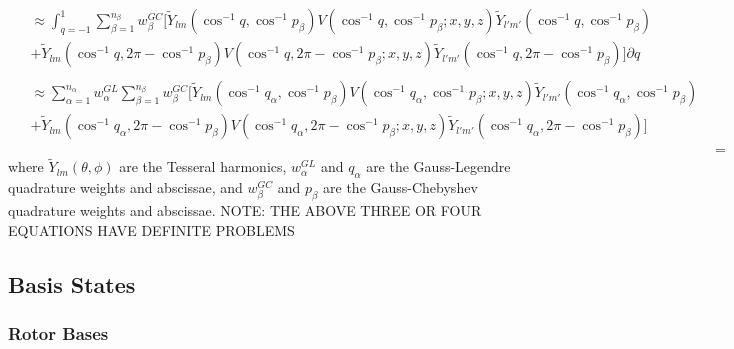 \documentclass{revtex4-1}
\begin{document}
\begin{align}
											 \begin{split} &\approx\int_{q=-1}^{1}\sum_{\beta=1}^{n_{\beta}}w^{GC}_{\beta}\lbrack\widetilde{Y}_{lm}(\cos^{-1}q, \cos^{-1}p_{\beta})V(\cos^{-1}q, \cos^{-1}p_{\beta}; x,y,z)\widetilde{Y}_{l'm'}(\cos^{-1}q, \cos^{-1}p_{\beta}) \\&+ \widetilde{Y}_{lm}(\cos^{-1}q, 2\pi-\cos^{-1}p_{\beta})V(\cos^{-1}q, 2\pi-\cos^{-1}p_{\beta}; x,y,z)\widetilde{Y}_{l'm'}(\cos^{-1}q, 2\pi-\cos^{-1}p_{\beta})\rbrack \partial q \end{split}\\
											 \begin{split} &\approx\sum_{\alpha=1}^{n_{\alpha}}w^{GL}_{\alpha}\sum_{\beta=1}^{n_{\beta}}w^{GC}_{\beta}\lbrack\widetilde{Y}_{lm}(\cos^{-1}q_{\alpha}, \cos^{-1}p_{\beta})V(\cos^{-1}q_{\alpha}, \cos^{-1}p_{\beta}; x,y,z)\widetilde{Y}_{l'm'}(\cos^{-1}q_{\alpha}, \cos^{-1}p_{\beta}) \\&+ \widetilde{Y}_{lm}(\cos^{-1}q_{\alpha}, 2\pi-\cos^{-1}p_{\beta})V(\cos^{-1}q_{\alpha}, 2\pi-\cos^{-1}p_{\beta}; x,y,z)\widetilde{Y}_{l'm'}(\cos^{-1}q_{\alpha}, 2\pi-\cos^{-1}p_{\beta})\rbrack \end{split}\\
											 &=
\end{align} 
where $\widetilde{Y}_{lm}(\theta,\phi)$ are the Tesseral harmonics, $w^{GL}_{\alpha}$ and $q_{\alpha}$ are the Gauss-Legendre quadrature weights and abscissae, and $w^{GC}_{\beta}$ and $p_{\beta}$ are the Gauss-Chebyshev quadrature weights and abscissae.  NOTE: THE ABOVE THREE OR FOUR EQUATIONS HAVE DEFINITE PROBLEMS

\subsection{Basis States}\label{S:BS}
\subsubsection{Rotor Bases}\label{S:RotBS}
\end{document}
